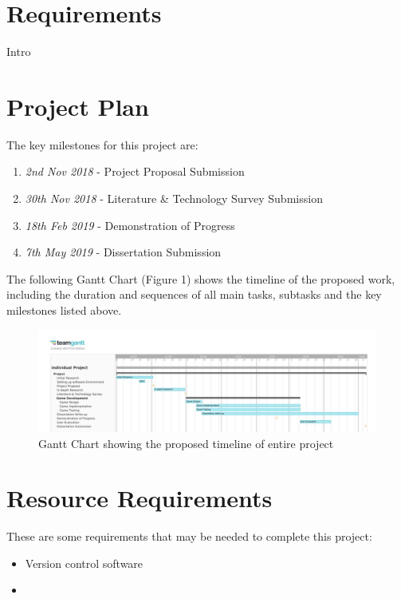 \documentclass[11pt, oneside]{article}   	%
\begin{document}
\newpage
\section{Requirements}

Intro

\newpage
\section{Project Plan}

The key milestones for this project are:

\begin{enumerate}
  \item \textit{2nd Nov 2018} - Project Proposal Submission
  \item \textit{30th Nov 2018} - Literature \& Technology Survey Submission
  \item \textit{18th Feb 2019} - Demonstration of Progress
  \item \textit{7th May 2019} - Dissertation Submission
\end{enumerate}

\hfill

The following Gantt Chart (Figure 1) shows the timeline of the proposed work, including the duration and sequences of all main tasks, subtasks and the key milestones listed above.



\begin{figure}[h!]
  \includegraphics[width=15cm]{GanttChart}
  \caption{Gantt Chart showing the proposed timeline of entire project}
\end{figure}

\newpage
\section{Resource Requirements}

These are some requirements that may be needed to complete this project:

\begin{itemize}
\item Version control software
\item 
\end{itemize}

\newpage


\end{document}
